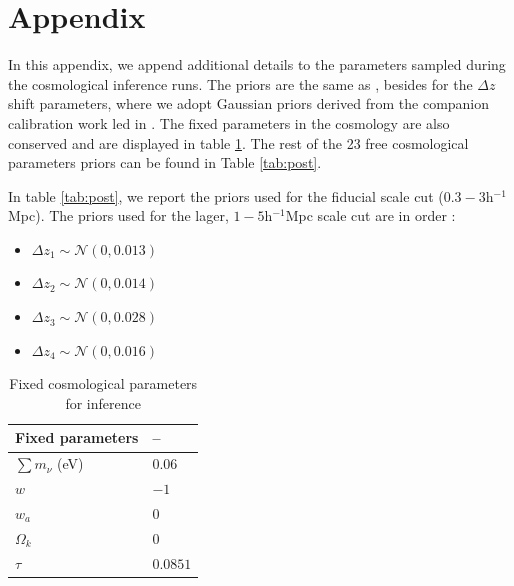 \section{Appendix}
\label{sec:appendix}

In this appendix, we append additional details to the parameters sampled during the cosmological inference runs. The priors are the same as \cite{Li2023_HSCY3_CosmicShear}, besides for the $\Delta z$ shift parameters, where we adopt Gaussian priors derived from the companion calibration work led in \cite{ChoppinDeJanvry2025a}. The fixed parameters in the cosmology are also conserved and are displayed in table \ref{tab:fixed}. The rest of the 23 free cosmological parameters priors can be found in Table \ref{tab:post}.

In table \ref{tab:post}, we report the priors used for the fiducial scale cut ($0.3-3$h$^{-1}$Mpc). The priors used for the lager, $1-5$h$^{-1}$Mpc scale cut are in order : 
\begin{itemize}
    \item $\Delta z_1\sim\mathcal{N}(0, 0.013)$
    \item $\Delta z_2\sim\mathcal{N}(0, 0.014)$
    \item $\Delta z_3\sim\mathcal{N}(0, 0.028)$
    \item $\Delta z_4\sim\mathcal{N}(0, 0.016)$
\end{itemize}

{\renewcommand{\arraystretch}{1.1}
\begin{table}[ht]
\centering
\caption{\label{tab:fixed}Fixed cosmological parameters for inference}
\begin{tabular}{l | l }
\hline
\textbf{Fixed parameters} & --\\
\hline
$\sum m_\nu$ (eV) & $0.06$\\
$w$ & $-1$\\
$w_a$ & $0$\\
$\Omega_k$ & $0$\\
$\tau$ & $0.0851$ \\
\end{tabular}
\end{table}}